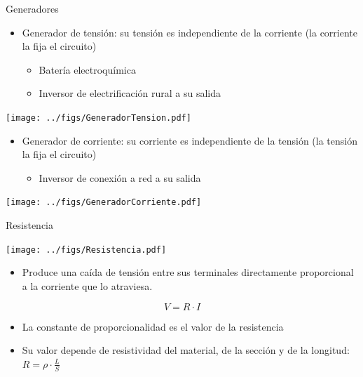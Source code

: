 \documentclass[xcolor={usenames,svgnames,dvipsnames}]{beamer}
\begin{document}
\begin{frame}[label={sec:org0926658}]{Generadores}
\begin{itemize}
\item \alert{Generador de tensión}: su tensión es independiente de la corriente
(la corriente la fija el circuito)

\begin{itemize}
\item Batería electroquímica

\item Inversor de electrificación rural a su salida
\end{itemize}
\end{itemize}
\begin{center}
\texttt{[image: ../figs/GeneradorTension.pdf]}
\end{center}

\begin{itemize}
\item \alert{Generador de corriente}: su corriente es independiente de la tensión
(la tensión la fija el circuito)

\begin{itemize}
\item Inversor de conexión a red a su salida
\end{itemize}
\end{itemize}
\begin{center}
\texttt{[image: ../figs/GeneradorCorriente.pdf]}
\end{center}
\end{frame}

\begin{frame}[label={sec:orgee3d178}]{Resistencia}
\begin{center}
\texttt{[image: ../figs/Resistencia.pdf]}
\end{center}


\begin{itemize}
\item \alert{Produce una caída de tensión entre sus terminales directamente
proporcional a la corriente que lo atraviesa}.
\end{itemize}
\[
V=R\cdot I
\]
\begin{itemize}
\item La constante de proporcionalidad es el valor de la resistencia

\item Su valor depende de resistividad del material, de la sección y de la
longitud: \(R=\rho\cdot\frac{L}{S}\)
\end{itemize}
\end{frame}
\end{document}

